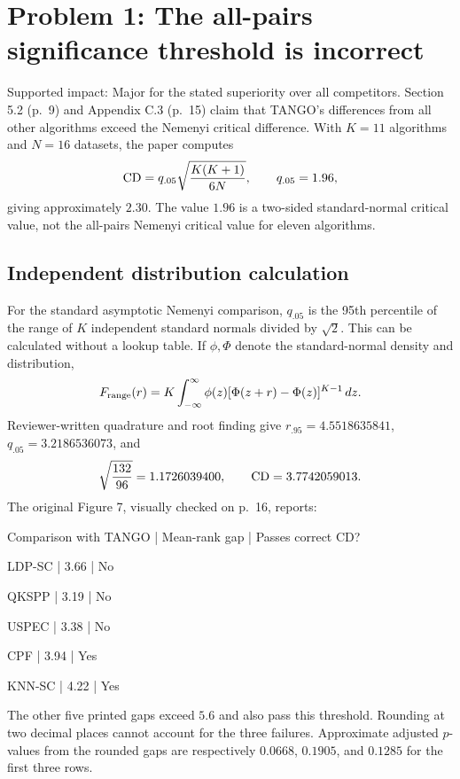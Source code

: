 \documentclass[10pt]{article}
\begin{document}
\section*{Problem 1: The all-pairs significance threshold is incorrect}
Supported impact: Major for the stated superiority over all competitors. Section 5.2 (p. 9) and Appendix C.3 (p. 15) claim that TANGO’s differences from all other algorithms exceed the Nemenyi critical difference. With \(K=11\) algorithms and \(N=16\) datasets, the paper computes \[{\rm CD}=q_{.05}\sqrt{\frac{K(K+1)}{6N}},\qquad q_{.05}=1.96,\] giving approximately \(2.30\). The value \(1.96\) is a two-sided standard-normal critical value, not the all-pairs Nemenyi critical value for eleven algorithms.\par
\subsection*{Independent distribution calculation}
For the standard asymptotic Nemenyi comparison, \(q_{.05}\) is the 95th percentile of the range of \(K\) independent standard normals divided by \(\sqrt2\). This can be calculated without a lookup table. If \(\phi,\Phi\) denote the standard-normal density and distribution, \[F_{\rm range}(r)=K\int_{-\infty}^{\infty}
       \phi(z)[\Phi(z+r)-\Phi(z)]^{K-1}\,dz.\] Reviewer-written quadrature and root finding give \(r_{.95}=4.5518635841\), \(q_{.05}=3.2186536073\), and \[\sqrt{\frac{132}{96}}=1.1726039400,\qquad {\rm CD}=3.7742059013.\] The original Figure 7, visually checked on p. 16, reports:\par
Comparison with TANGO | Mean-rank gap | Passes correct CD?\par
LDP-SC | 3.66 | No\par
QKSPP | 3.19 | No\par
USPEC | 3.38 | No\par
CPF | 3.94 | Yes\par
KNN-SC | 4.22 | Yes\par
The other five printed gaps exceed \(5.6\) and also pass this threshold. Rounding at two decimal places cannot account for the three failures. Approximate adjusted \(p\)-values from the rounded gaps are respectively \(0.0668\), \(0.1905\), and \(0.1285\) for the first three rows.\par
\end{document}
